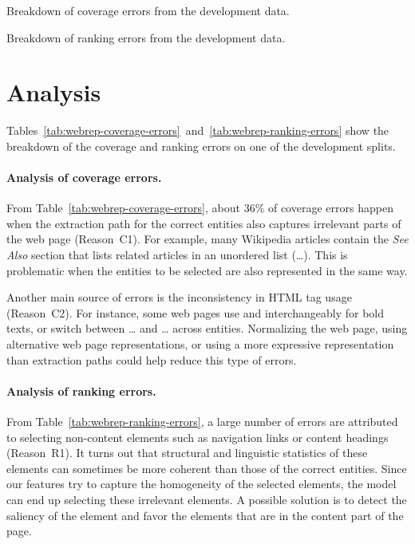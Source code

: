 \begin{table}[p]\centering

\caption{Breakdown of coverage errors from the development data.}\label{tab:webrep-coverage-errors}
\end{table}

\begin{table}[p]\centering

\caption{Breakdown of ranking errors from the development data.}\label{tab:webrep-ranking-errors}
\end{table}

\section{Analysis}\label{sec:openweb-analysis}

Tables~\ref{tab:webrep-coverage-errors}~and~\ref{tab:webrep-ranking-errors}
show the breakdown of the coverage and ranking errors
on one of the development splits.

\paragraph{Analysis of coverage errors.}
From Table~\ref{tab:webrep-coverage-errors},
about 36\% of coverage errors happen when
the extraction path for the correct entities also 
captures irrelevant parts of the web page (Reason~C1).
For example, many Wikipedia articles contain
the \emph{See Also} section that lists
related articles in an unordered list
(\dots{}).
This is problematic when the entities to be selected
are also represented in the same way.

Another main source of errors is the inconsistency
in HTML tag usage (Reason~C2).
For instance, some web pages use 
and  interchangeably
for bold texts,
or switch between \dots{}
and \dots{} across entities.
Normalizing the web page,
using alternative web page representations,
or using a more expressive representation
than extraction paths could help reduce this type of errors.

\paragraph{Analysis of ranking errors.}
From Table~\ref{tab:webrep-ranking-errors},
a large number of errors are attributed to
selecting non-content elements such as
navigation links or content headings (Reason~R1).
It turns out that structural and linguistic
statistics of these elements can sometimes
be more coherent than those of the correct entities.
Since our features try to capture the
homogeneity of the selected elements,
the model can end up selecting these irrelevant elements.
A possible solution is to
detect the saliency of the element
and favor the elements that are in the content part
of the page.

